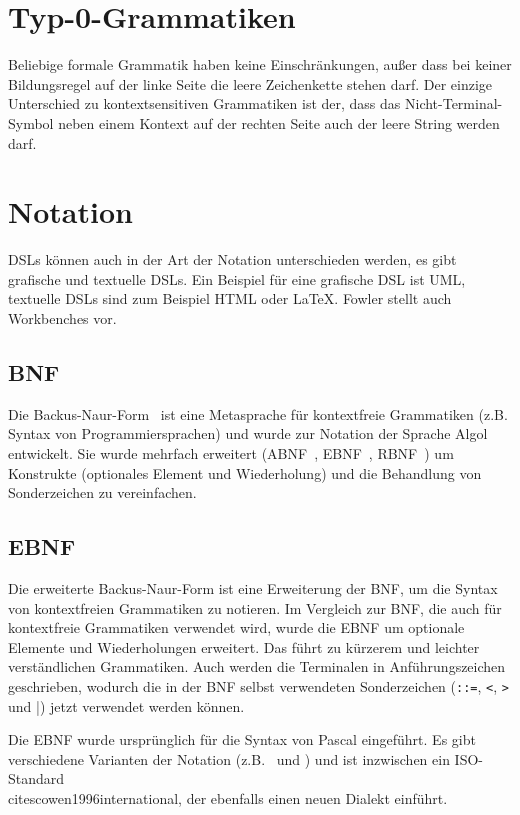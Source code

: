 \documentclass[../InterneDSLs.tex]{subfiles}
\begin{document}
\section{Typ-0-Grammatiken}\label{sec:beliebigegrammatik}
Beliebige formale Grammatik haben keine Einschränkungen, außer dass bei keiner Bildungsregel auf der linke Seite die leere Zeichenkette stehen darf. Der einzige Unterschied zu kontextsensitiven Grammatiken ist der, dass das Nicht-Terminal-Symbol neben einem Kontext auf der rechten Seite auch der leere String werden darf.


\section{Notation}\label{SEC:Notation}
DSLs können auch in der Art der Notation unterschieden werden, es gibt grafische und textuelle DSLs. Ein Beispiel für eine grafische DSL ist UML, textuelle DSLs sind zum Beispiel HTML oder LaTeX. Fowler stellt auch Workbenches vor.\cite[S. 22ff]{Fowler.2010}

\subsection{BNF}
Die Backus-Naur-Form~\cite{bnf.wikipedia} ist eine Metasprache für kontextfreie Grammatiken (z.B. Syntax von Programmiersprachen) und wurde zur Notation der Sprache Algol entwickelt. Sie wurde mehrfach erweitert (ABNF~\cite{crocker1997augmented}, EBNF~\cite{ebnf.wikipedia}, RBNF~\cite{farrel2009routing}) um Konstrukte (optionales Element und Wiederholung) und die Behandlung von Sonderzeichen zu vereinfachen.

\subsection{EBNF}
Die erweiterte Backus-Naur-Form ist eine Erweiterung der BNF, um die Syntax von kontextfreien Grammatiken zu notieren. Im Vergleich zur BNF, die auch für kontextfreie Grammatiken verwendet wird, wurde die EBNF um optionale Elemente und Wiederholungen erweitert. Das führt zu kürzerem und leichter verständlichen Grammatiken. Auch werden die Terminalen in Anführungszeichen geschrieben, wodurch die in der BNF selbst verwendeten Sonderzeichen (\verb|::=|, \verb|<|, \verb|>| und \verb|||) jetzt verwendet werden können.

Die EBNF wurde ursprünglich für die Syntax von Pascal eingeführt. Es gibt verschiedene Varianten der Notation (z.B.~\cite{wirthsyntaxnotation.wikipedia} und \cite{ebnfnotations.jinks}) und ist inzwischen ein ISO-Standard\\cite{scowen1996international}, der ebenfalls einen neuen Dialekt einführt.
\end{document}
